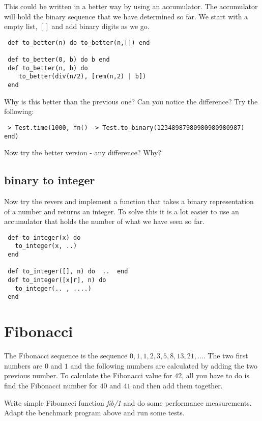 \documentclass[a4paper,11pt]{article}
\begin{document}
This could be written in a better way by using an accumulator. The
accumulator will hold the binary sequence that we have determined so
far. We start with a empty list, $[]$ and add binary digits as we go.

\begin{verbatim}
 def to_better(n) do to_better(n,[]) end

 def to_better(0, b) do b end
 def to_better(n, b) do
    to_better(div(n/2), [rem(n,2) | b])
 end
\end{verbatim}

Why is this better than the previous one? Can you notice the difference?  Try the following:

\begin{verbatim}
 > Test.time(1000, fn() -> Test.to_binary(12348987980980980980987) end)
\end{verbatim}

Now try the better version - any difference? Why?

\subsection{binary to integer}

Now try the revers and implement a function that takes a binary
representation of a number and returns an integer. To solve this it is
a lot easier to use an accumulator that holds the number of what we
have seen so far.

\begin{verbatim}
 def to_integer(x) do
   to_integer(x, ..)
 end
  
 def to_integer([], n) do  ..  end
 def to_integer([x|r], n) do
   to_integer(.. , ....)
 end
\end{verbatim}


\section{Fibonacci}

The Fibonacci sequence is the sequence $0,1,1,2,3,5,8,13,21,
\ldots$. The two first numbers are $0$ and $1$ and the following
numbers are calculated by adding the two previous number. To calculate
the Fibonacci value for $42$, all you have to do is find the Fibonacci
number for $40$ and $41$ and then add them together.

Write simple Fibonacci function {\em fib/1} and do some performance
measurements. Adapt the benchmark program above and run some tests.
\end{document}
